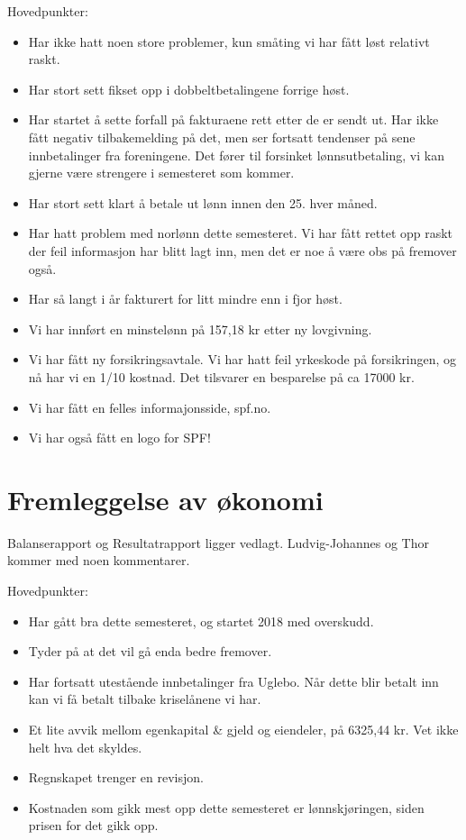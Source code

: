 \documentclass[a4paper,norsk]{article}
\begin{document}
Hovedpunkter:
\begin{itemize}
	\item Har ikke hatt noen store problemer, kun småting vi har fått løst relativt raskt.
	\item Har stort sett fikset opp i dobbeltbetalingene forrige høst. 
	\item Har startet å sette forfall på fakturaene rett etter de er sendt ut. Har ikke fått negativ tilbakemelding på det, men ser fortsatt tendenser på sene innbetalinger fra foreningene. Det fører til forsinket lønnsutbetaling, vi kan gjerne være strengere i semesteret som kommer.
	\item Har stort sett klart å betale ut lønn innen den 25. hver måned.
	\item Har hatt problem med norlønn dette semesteret. Vi har fått rettet opp raskt der feil informasjon har blitt lagt inn, men det er noe å være obs på fremover også.
	\item Har så langt i år fakturert for litt mindre enn i fjor høst.
	\item Vi har innført en minstelønn på 157,18 kr etter ny lovgivning.
	\item Vi har fått ny forsikringsavtale. Vi har hatt feil yrkeskode på forsikringen, og nå har vi en 1/10 kostnad. Det tilsvarer en besparelse på ca 17000 kr.
	\item Vi har fått en felles informajonsside, spf.no.
	\item Vi har også fått en logo for SPF!
\end{itemize}

\section{Fremleggelse av økonomi}
Balanserapport og Resultatrapport ligger vedlagt. Ludvig-Johannes og Thor kommer med noen kommentarer.

Hovedpunkter:
\begin{itemize}
	\item Har gått bra dette semesteret, og startet 2018 med overskudd.
	\item Tyder på at det vil gå enda bedre fremover.
	\item Har fortsatt utestående innbetalinger fra Uglebo. Når dette blir betalt inn kan vi få betalt tilbake kriselånene vi har.
	\item Et lite avvik mellom egenkapital \& gjeld og eiendeler, på 6325,44 kr. Vet ikke helt hva det skyldes.
	\item Regnskapet trenger en revisjon.
	\item Kostnaden som gikk mest opp dette semesteret er lønnskjøringen, siden prisen for det gikk opp.
\end{itemize}
\end{document}
